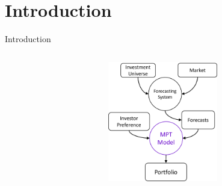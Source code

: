\section{Introduction}


\begin{frame}{Introduction}
    \begin{columns}
    \begin{column}{0.55\textwidth}
     \tableofcontents[currentsection]
     \end{column}
    \begin{column}{0.55\textwidth}
        \begin{center}
        \includegraphics[width=4.8cm]{images/mpt.png}
        \end{center}
     \end{column}     
     \end{columns}
\end{frame}


